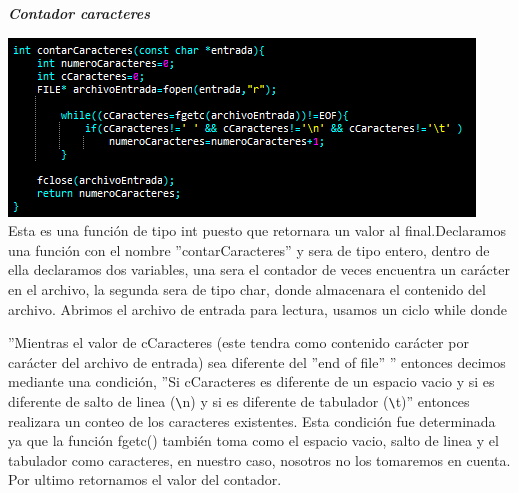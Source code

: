 \documentclass[12pt,letterpaper]{report}
\begin{document}
\newpage
\textbf{\textit{\em{Contador caracteres}}}
\begin{multicols}{2}

\includegraphics[scale=0.7]{punto8-2}\\
Esta es una función de tipo int puesto que retornara un valor al final.Declaramos una función con el nombre ''contarCaracteres'' y sera de tipo entero, dentro de ella declaramos dos variables, una sera el contador de veces encuentra un carácter en el archivo, la segunda sera de tipo char, donde almacenara el contenido del archivo. Abrimos el archivo de entrada para lectura, usamos un ciclo while donde 
\end{multicols}
''Mientras el valor de cCaracteres (este tendra como contenido carácter por carácter del archivo de entrada) sea diferente del ''end of file'' '' entonces decimos mediante una condición, ''Si cCaracteres es diferente de un espacio vacio y si es diferente de salto de linea (\verb'\'n) y si es diferente de tabulador (\verb'\'t)'' entonces realizara un conteo de los caracteres existentes. Esta condición fue determinada ya que la función fgetc() también toma como el espacio vacio, salto de linea y el tabulador como caracteres, en nuestro caso, nosotros no los tomaremos en cuenta. Por ultimo retornamos el valor del contador.\\
\end{document}
